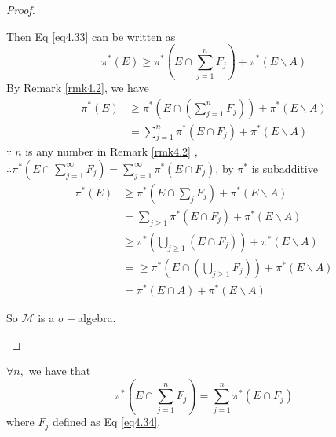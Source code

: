 \begin{proof}
\begin{enumerate}
\begin{enumerate}
			Then Eq \ref{eq4.33} can be written as
			\begin{equation}
			{\pi ^*}\left( E \right) \geqslant {\pi ^*}\left( {E \cap \sum\limits_{j = 1}^n {{F_j}} } \right) + {\pi ^*}\left( {E\backslash A} \right)
			\label{eq4.36}
			\end{equation}
			By Remark \ref{rmk4.2}, we have 
				\begin{equation}
				\begin{split}
				{\pi ^*}\left( E \right) & \geqslant {\pi ^*}\left( {E \cap \left( {\sum\limits_{j = 1}^n {{F_j}} } \right)} \right) + {\pi ^*}\left( {E\backslash A} \right)\\
										 & = \sum\limits_{j = 1}^n {{\pi ^*}\left( {E \cap {F_j}} \right)}  + {\pi ^*}\left( {E\backslash A} \right)
				\end{split}
				\label{eq4.37}
				\end{equation}
				$\because \;n$ is any number in Remark \ref{rmk4.2} , $\therefore {\pi ^*}\left( {E \cap \sum\limits_{j = 1}^\infty  {{F_j}} } \right) = \sum\limits_{j = 1}^\infty  {{\pi ^*}\left( {E \cap {F_j}} \right)} $, by  $ {\pi ^*} $ is  subadditive
				\begin{equation}
				\begin{split}
				{\pi ^*}\left( E \right) & \geqslant {\pi ^*}\left( {E \cap \sum\limits_j {{F_j}} } \right) + {\pi ^*}\left( {E\backslash A} \right)\\
										 &  = \sum\limits_{j \geqslant 1} {{\pi ^*}\left( {E \cap {F_j}} \right)}  + {\pi ^*}\left( {E\backslash A} \right)\\
										 & \geqslant {\pi ^*}\left( {\bigcup\limits_{j \geqslant 1} {\left( {E \cap {F_j}} \right)} } \right) + {\pi ^*}\left( {E\backslash A} \right)\\
										 & =  \geqslant {\pi ^*}\left( {E \cap \left( {\bigcup\limits_{j \geqslant 1} {{F_j}} } \right)} \right) + {\pi ^*}\left( {E\backslash A} \right)\\
									   	 &  = {\pi ^*}\left( {E \cap A} \right) + {\pi ^*}\left( {E\backslash A} \right)
				\end{split}
				\label{eq4.38}
				\end{equation}
		\end{enumerate}
	So $ \mathcal{M} $ is a $ \sigma- $algebra.
	\end{enumerate}
\end{proof}

\begin{remark}
	$ \forall n, $ we have that
	\begin{equation}
	{\pi ^*}\left( {E \cap \sum\limits_{j = 1}^n {{F_j}} } \right) = \sum\limits_{j = 1}^n {{\pi ^*}\left( {E \cap {F_j}} \right)} 
	\label{eq4.39}
	\end{equation}
	where ${F_j}$ defined as Eq \ref{eq4.34}.
	\label{rmk4.2}
\end{remark}

